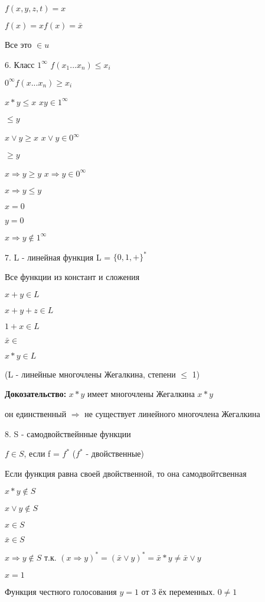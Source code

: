 \documentclass[russian]{lecture-notes}
\begin{document}
	$f(x,y,z,t) = x$

	$f(x) = x f(x) = \bar{x}$

	Все это $\in u$

	6. Класс $1^{\infty}$ $f(x_{1}...x_{n}) \leqslant x_{i} $

	\qquad $0^{\infty} f(x...x_{n}) \geqslant x_{i}$

	$x*y \leqslant x$ \qquad $xy \in 1^{\infty}$

	\quad $\leqslant y$

	$x \lor y \geqslant x$ \qquad $x \lor y \in 0^{\infty}$

	\quad $\geqslant y$

	$x \Rightarrow y \geqslant y$ \quad $x \Rightarrow y \in 0^{\infty} $

	$x \Rightarrow y \leqslant y $

	\qquad $x=0$

	\qquad $y=0$

	$x \Rightarrow y \notin 1^{\infty}$

	7. L - линейная функция L = $\{0,1,+\}^{*}$

	Все функции из констант и сложения

	$x+y \in L$

	$x+y + z \in L$

	$1+x \in L$

	$\bar{x} \in$

	$x * y \in L$

	(L - линейные многочлены Жегалкина, степени $\leqslant$ 1)

	\textbf{Докозательство: } $ x * y$ имеет многочлены Жегалкина $x*y$

	он единственный $\Rightarrow $ не существует линейного многочлена Жегалкина %

	8. S - самодвойствейнные функции

	$f \in S$, если f = $f^{*}$ \quad ($f^{*} $ - двойственные)

	Если функция равна своей двойственной, то она самодвойтсвенная

	\begin{example}
		$x*y \notin S$

		$x \lor y \notin S$

		$x \in S$

		$\bar{x} \in S$

		$x \Rightarrow y \notin S $ т.к. $(x \Rightarrow y)^{*} = (\bar{x} \lor y)^{*} = \bar{x}*y \neq \bar{x} \lor y$

		$x = 1$
		\end{example}
	Функция честного голосования $y = 1$ от 3 ёх переменных. $0 \neq 1$
\end{document}
